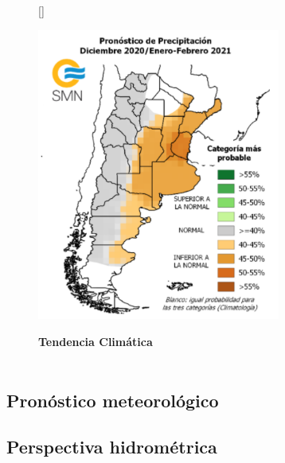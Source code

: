 \documentclass[11pt,spanish,a4paper] {article}
\DeclareRobustCommand{\tendenciaclimatica}{}
\DeclareRobustCommand{\pronosticometeorologico}{}
\DeclareRobustCommand{\perspectivahidrometrica}{}
\DeclareRobustCommand{\pronosemanal}{}
\begin{document}
\begin{figure}[H]
	[\FBwidth]
	{\caption{\large{\textbf{Tendencia Climática}}\\\hspace{\textwidth}\\\hspace{\textwidth}\tendenciaclimatica}\label{smnmap}}
	{\includegraphics[width=8cm]{smn_map_file.png}}
\end{figure}
\subsection*{Pronóstico meteorológico}
\pronosticometeorologico
\subsection*{Perspectiva hidrométrica}
\perspectivahidrometrica

\pronosemanal
\end{document}
